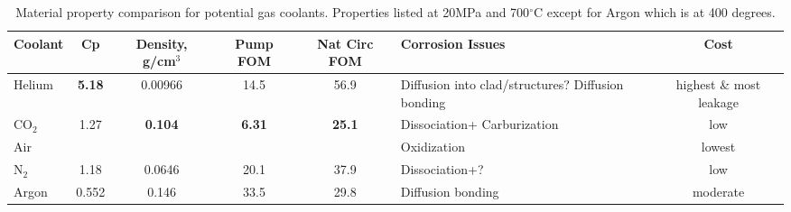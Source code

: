 \documentclass[]{report}
\begin{document}
\begin{table} \label{tab:gases}
\hspace*{-2cm} %
\begin{tabular}{|l|c|c|c|c|p{2.75cm}|c|}
%
%
\hline
Coolant &  Cp & Density, g/cm$^3$  & Pump FOM & Nat Circ FOM & Corrosion Issues & Cost\\
\hline
Helium & \textbf{5.18} & 0.00966 & 14.5 & 56.9 & Diffusion into clad/structures? Diffusion bonding & highest \& most leakage\\
\hline
CO$_2$ & 1.27 & \textbf{0.104} & \textbf{6.31} & \textbf{25.1} & Dissociation+ Carburization &  low\\
\hline
Air & & & & & Oxidization & lowest\\
\hline
N$_2$ & 1.18 & 0.0646 & 20.1 & 37.9 & Dissociation+? & low \\
\hline
Argon & 0.552 & 0.146 & 33.5 & 29.8 & Diffusion bonding & moderate\\
\hline
\end{tabular}
\caption{Material property comparison for potential gas coolants. Properties listed at 20MPa and 700$^\circ$C except for Argon which is at 400 degrees.} %
\end{table}
\end{document}
